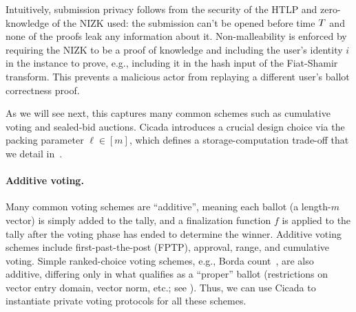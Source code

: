 Intuitively, submission privacy follows from the security of the HTLP and zero-knowledge of the NIZK used: the submission can't be opened before time $T$ and none of the proofs leak any information about it. Non-malleability is enforced by requiring the NIZK to be a proof of knowledge and including the user's identity $i$ in the instance to prove, e.g., including it in the hash input of the Fiat-Shamir transform. This prevents a malicious actor from replaying a different user's ballot correctness proof.



As we will see next, this captures many common schemes such as cumulative voting and sealed-bid auctions. 
Cicada introduces a crucial design choice via the packing parameter $\ell\in[m]$, which defines a storage-computation trade-off that we detail in~. %



\paragraph{Additive voting.}
Many common voting schemes are ``additive'', meaning each ballot (a length-$m$ vector) is simply added to the tally, and a finalization function $f$ is applied to the tally after the voting phase has ended to determine the winner. 
Additive voting schemes include first-past-the-post (FPTP), approval, range, and cumulative voting. Simple ranked-choice voting schemes, e.g., Borda count~\cite{Emerson13}, are also additive, differing only in what qualifies as a ``proper'' ballot (restrictions on vector entry domain, vector norm, etc.; see ). 
Thus, we can use Cicada to instantiate private voting protocols for all these schemes.

